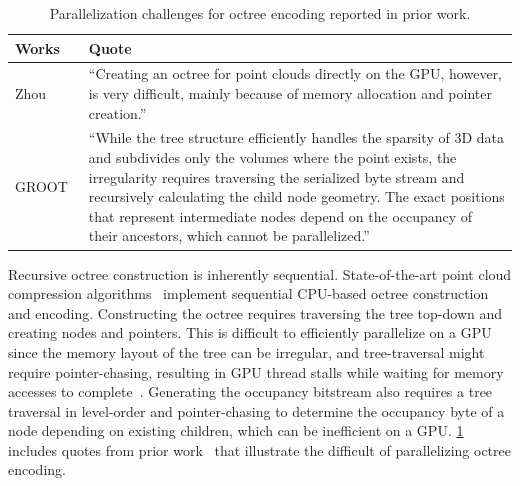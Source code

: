 
\begin{table}[t]
  \centering
  {%
  \begin{tabular}{lp{}}
    \hline
    \textbf{Works} & \textbf{Quote}  \\ \hline
    Zhou~\cite{octree-gpu2011} & ``Creating an octree for point clouds directly on the GPU, however, is very difficult, mainly because of memory allocation and pointer creation.'' \\ \hline
    GROOT~\cite{groot} & ``While the tree structure efficiently handles the sparsity of 3D data and subdivides only the volumes where the point exists, the irregularity requires traversing the serialized byte stream and recursively calculating the child node geometry. The exact positions that represent intermediate nodes depend on the occupancy of their ancestors, which cannot be parallelized.'' \\ \hline
  \end{tabular}}
  \caption{Parallelization challenges for octree encoding reported in prior work.}
  \label{tab:octree-challenge}
\end{table}

%
Recursive octree construction is inherently sequential.
%
State-of-the-art point cloud compression algorithms~\cite{gpcc,draco,pcl} implement sequential CPU-based octree construction and encoding.
%
Constructing the octree requires traversing the tree top-down and creating nodes and pointers.
%
This is difficult to efficiently parallelize on a GPU since the memory layout of the tree can be irregular, and tree-traversal might require pointer-chasing, resulting in GPU thread stalls while waiting for memory accesses to complete~\cite{octree-gpu2011,octree-cpu2020,groot}.
%
Generating the occupancy bitstream also requires a tree traversal in level-order and pointer-chasing to determine the occupancy byte of a node depending on existing children, which can be inefficient on a GPU.
%
\cref{tab:octree-challenge} includes quotes from prior work~\cite{octree-gpu2011,groot} that illustrate the difficult of parallelizing octree encoding.

